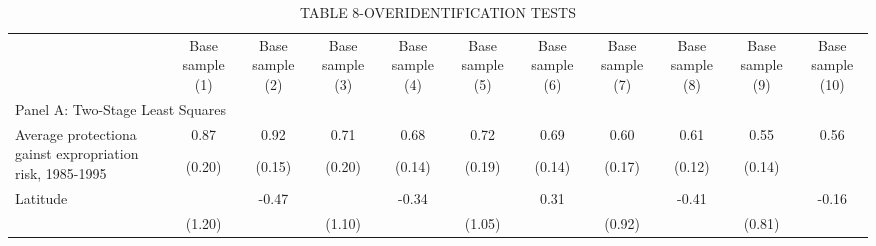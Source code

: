 \begin{table}[htbp]
\centering
\caption{TABLE  8-OVERIDENTIFICATION TESTS}
\begin{tabular}{lcccccccccc}
\hline
 & Base sample (1) & Base sample (2) & Base sample (3) & Base sample (4) & Base sample (5) & Base sample (6) & Base sample (7) & Base sample (8) & Base sample (9) & Base sample (10) \\
\multicolumn{11}{l}{Panel A: Two-Stage Least Squares} \\
\multirow{2}{*}{Average protectiona gainst expropriation risk, 1985-1995} & 0.87 & 0.92 & 0.71 & 0.68 & 0.72 & 0.69 & 0.60 & 0.61 & 0.55 & 0.56 \\
(0.14) & (0.20) & (0.15) & (0.20) & (0.14) & (0.19) & (0.14) & (0.17) & (0.12) & (0.14) \\
\multirow{2}{*}{Latitude} &  & -0.47 &  & -0.34 &  & 0.31 &  & -0.41 &  & -0.16 \\
 & (1.20) &  & (1.10) &  & (1.05) &  & (0.92) &  & (0.81) \\
\hline
\end{tabular}
\end{table}

